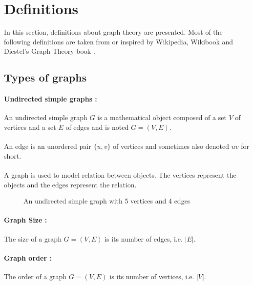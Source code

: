 \section{Definitions}
In this section, definitions about graph theory are presented. Most
of the following definitions are taken from or inspired by Wikipedia,
Wikibook and Diestel's Graph Theory book \cite{Diestel}.

\subsection{Types of graphs}
\paragraph{Undirected simple graphs :}
An undirected simple graph $G$ is a mathematical object composed of a set $V$ of
vertices and a set $E$ of edges and is noted $G = (V,E)$.

\paragraph{}
An edge is an unordered pair $\{u,v\}$ of vertices and sometimes also denoted 
$uv$ for short.

\paragraph{}
A graph is used to model relation between objects. The vertices represent the 
objects and the edges represent the relation.


\begin{figure}[!h]
  \begin{center}
    
  \end{center}
  \caption{An undirected simple graph with 5 vertices and 4 edges}
\end{figure}

\paragraph{Graph Size :}
The size of a graph $G=(V,E)$ is its number of edges, i.e. $|E|$.

\paragraph{Graph order :}
The order of a graph $G=(V,E)$ is its number of vertices, i.e. $|V|$.

